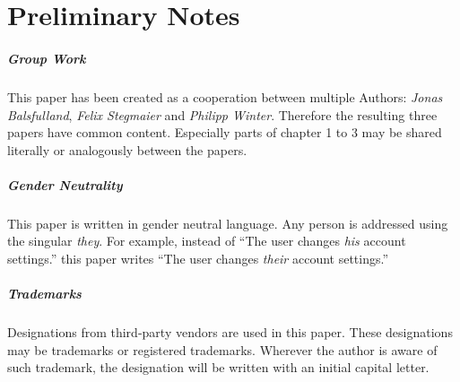 \clearpage
\chapter*{Preliminary Notes}
\label{chap:prenotes}
\thispagestyle{scrheadings}


\paragraph{Group Work}
This paper has been created as a cooperation between multiple Authors: 
\emph{Jonas Balsfulland}, \emph{Felix Stegmaier} and \emph{Philipp Winter}.
Therefore the resulting three papers have common content.
Especially parts of chapter 1 to 3 may be shared literally or analogously between the papers.


\paragraph{Gender Neutrality}
This paper is written in gender neutral language.
Any person is addressed using the singular \emph{they}.
For example, instead of 
``The user changes \emph{his} account settings.''
this paper writes 
``The user changes \emph{their} account settings.''


\paragraph{Trademarks}
Designations from third-party vendors are used in this paper.
These designations may be trademarks or registered trademarks.
Wherever the author is aware of such trademark, 
the designation will be written with an initial capital letter.


